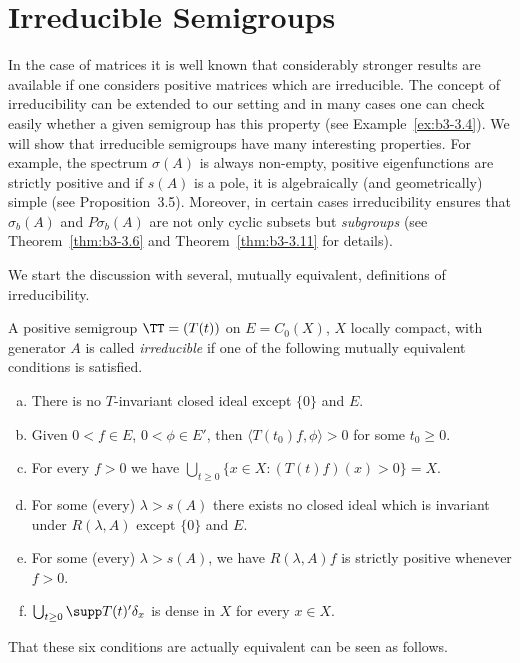 \section{Irreducible Semigroups}
In the case of matrices it is well known that considerably stronger results are available if one considers positive matrices which are irreducible. The concept of irreducibility can be extended to our setting and in many cases one can check easily whether a given semi­group has this property (see Example~\ref{ex:b3-3.4}). We will show that irreducible semigroups have many interesting properties. For example, the spectrum $\sigma(A)$ is always non-empty, positive eigenfunctions are strictly positive and if $s(A)$ is a pole, it is algebraically (and geometri­cally) simple (see Proposition~3.5). Moreover, in certain cases irreducibili­ty ensures that $\sigma_{b}(A)$ and $P\sigma_{b}(A)$ are not only cyclic subsets but \emph{subgroups} (see Theorem~\ref{thm:b3-3.6} and Theorem~\ref{thm:b3-3.11} for details). 

We start the discussion with several, mutually equivalent, definitions of irreducibility. 

\begin{definition}\label{def:b3-3.1}
A positive semigroup $\TT = (T(t))$ on $E = C_{0}(X)$, $X$ locally compact, with generator $A$ is called \emph{irreducible} if one of the following mutually equivalent conditions is satisfied.
\begin{enumerate}[(a)]

\item\label{item:b3-3.1-i}
There is no $T$-invariant closed ideal except $\{0\}$ and $E$.
	
\item\label{item:b3-3.1-ii}
Given $0 < f \in E$, $0 < \phi \in E'$, then $\langle T(t_{0})f,\phi \rangle > 0$ for some $t_{0} \geq 0$.
	
\item
For every $f > 0$ we have $\bigcup_{t \geq 0}\{x \in X : (T(t)f)(x) > 0\} = X$.
	
\item
For some (every) $\lambda > s(A)$ there exists no closed ideal which is invariant under $R(\lambda,A)$ except $\{0\}$ and $E$.
	
\item
For some (every) $\lambda > s(A)$, we have $R(\lambda,A)f$ is strictly positive whenever $f > 0$.
	
\item
$\bigcup_{t \geq 0}\supp T(t)'\delta_{x}$ is dense in $X$ for every $x \in X$.

\end{enumerate}
\end{definition}
That these six conditions are actually equivalent can be seen as follows.

